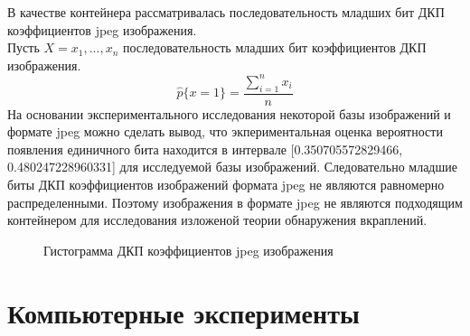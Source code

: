 ﻿\documentclass[a4paper,12pt]{article}
\theoremstyle{plain}
\begin{document}
В качестве контейнера рассматривалась последовательность младших бит ДКП коэффициентов jpeg изображения.\\
Пусть $X={x_1,..., x_n}$ последовательность младших бит коэффициентов ДКП изображения.
\begin{equation}
\hat{p}\{x=1\}=\frac{\sum^n_{i=1}x_i}{n}
\end{equation}
На основании экспериментального исследования некоторой базы изображений и формате jpeg можно сделать вывод, что экпериментальная оценка вероятности появления единичного бита находится в интервале  [0.350705572829466, 0.480247228960331] для исследуемой базы изображений. Следовательно младшие биты ДКП коэффициентов изображений формата jpeg не являются равномерно распределенными. Поэтому изображения в формате jpeg не являются подходящим контейнером для исследования изложеной теории обнаружения вкраплений. \\
\begin{figure}[h]
	\caption{Гистограмма ДКП коэффициентов jpeg изображения}
	\label{ris:"hist1.png"}
\end{figure}
\clearpage
\newpage
\section{Компьютерные эксперименты}
 
\end{document}
